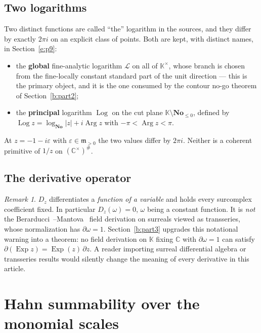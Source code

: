 \documentclass[11pt,a4paper]{article}
\numberwithin{equation}{section}
\theoremstyle{definition}
\theoremstyle{remark}
\newtheorem{remark}[theorem]{Remark}
\theoremstyle{plain}
\newcommand{\K}{\mathbb K}
\newcommand{\No}{\mathbf{No}}
\newcommand{\CC}{\mathbb C}
\newcommand{\mm}{\mathfrak m}
\DeclareMathOperator{\Arg}{Arg}
\DeclareMathOperator{\Log}{Log}
\DeclareMathOperator{\Exp}{Exp}
\newcommand{\halo}[1]{#1^{\#}}
\newcommand{\abs}[1]{\lvert #1\rvert}
\begin{document}
\subsection{Two logarithms}\label{a:rem:twologs}

Two distinct functions are called ``the'' logarithm in the sources, and
they differ by exactly $2\pi i$ on an explicit class of points.  Both
are kept, with distinct names, in Section~\ref{e:p9}:
\begin{itemize}[leftmargin=1.4em]
\item the \textbf{global} fine-analytic logarithm $\mathcal L$ on all of
$\K^{\times}$, whose branch is chosen from the fine-locally constant
standard part of the unit direction --- this is the primary object, and
it is the one consumed by the contour no-go theorem of Section~\ref{b:part2};
\item the \textbf{principal} logarithm $\Log$ on the cut plane
$\K\setminus\No_{\le0}$, defined by
$\Log z=\log_{\No}\abs z+i\Arg z$ with $-\pi<\Arg z<\pi$.
\end{itemize}
At $z=-1-i\varepsilon$ with $\varepsilon\in\mm_{>0}$ the two values
differ by $2\pi i$.  Neither is a coherent primitive of $1/z$ on
$\halo{(\CC^{\times})}$.

\subsection{The derivative operator}\label{a:rem:derivative}

\begin{remark}\label{a:rule:derivative}
$D_z$ differentiates a \emph{function of a variable} and holds every
surcomplex coefficient fixed.  In particular $D_z(\omega)=0$, $\omega$
being a constant function.  It is \emph{not} the Berarducci~\cite{BMder}--Mantova~\cite{Mantova2026b}
field derivation on surreals viewed as transseries, whose normalization
has $\partial\omega=1$.  Section~\ref{b:part3} upgrades this notational warning into a
theorem: no field derivation on $\K$ fixing $\CC$ with
$\partial\omega=1$ can satisfy $\partial(\Exp z)=\Exp(z)\,\partial z$.
A reader importing surreal differential algebra or transseries results
would silently change the meaning of every derivative in this article.
\end{remark}

\section{Hahn summability over the monomial scales}\label{a:sec:summability}
\end{document}
